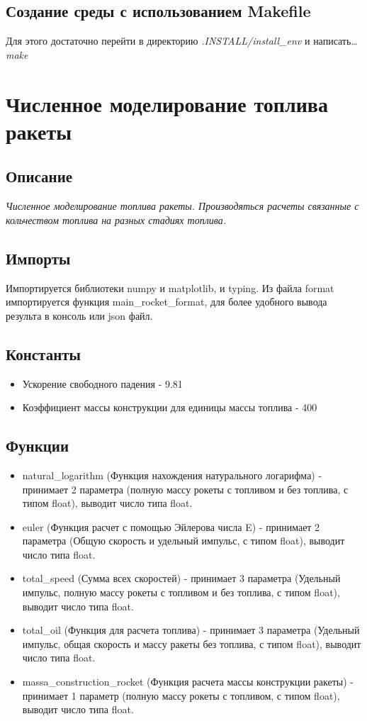 \documentclass[a4paper, 12pt]{report}
\begin{document}
\section{Создание среды с использованием Makefile}
\textrm{
    Для этого достаточно перейти в директорию {\slshape .INSTALL/install\_env} и написать\ldots {\slshape make}
}
\clearpage
\chapter{Численное моделирование топлива ракеты}
\section{Описание}
\textit{Численное моделирование топлива ракеты. Производяться расчеты связанные с кольчеством топлива на разных стадиях топлива.}\\
\section{Импорты}
\textrm{Импортируется библиотеки numpy и matplotlib, и typing. Из файла format импортируется функция main\_rocket\_format, для более удобного вывода результа в консоль или json файл.}
\section{Константы}
\begin{itemize}
    \item Ускорение свободного падения - 9.81
    \item Коэффициент массы конструкции для единицы массы топлива - 400
\end{itemize}

\section{Функции}
\begin{itemize}
    \item natural\_logarithm (Функция нахождения натурального логарифма) - принимает 2 параметра (полную массу рокеты с топливом и без топлива, с типом float), выводит число типа float.
    \item euler (Функция расчет с помощью Эйлерова числа E) - принимает 2 параметра (Общую скорость и удельный импульс, с типом float), выводит число типа float.
    \item total\_speed (Сумма всех скоростей) - принимает 3 параметра (Удельный импульс, полную массу рокеты с топливом и без топлива, с типом float), выводит число типа float.
    \item total\_oil (Функция для расчета топлива) - принимает 3 параметра (Удельный импульс, общая скорость и массу ракеты без топлива, с типом float), выводит число типа float.
    \item massa\_construction\_rocket (Функция расчета массы конструкции ракеты) - принимает 1 параметр (полную массу рокеты с топливом, с типом float), выводит число типа float.
\end{itemize}
\clearpage
\end{document}
